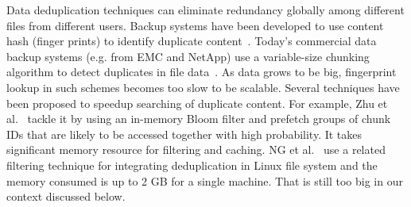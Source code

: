 Data deduplication techniques can eliminate redundancy globally among different files from different users. 
Backup systems have been developed to use content hash (finger prints) to identify duplicate 
content~\cite{venti02,Rhea2008}.
Today's commercial data backup systems (e.g. from EMC and NetApp)
use a variable-size chunking algorithm to detect duplicates in file data~\cite{similar94,hydrastor09}.
As data grows to be big, fingerprint lookup in such schemes
becomes too slow to be scalable.
Several techniques have been proposed to speedup searching of duplicate 
content. For example,  
Zhu et al.~\cite{bottleneck08} tackle it 
by using an in-memory Bloom filter and prefetch groups of chunk IDs that are likely to be 
accessed together with high probability. It takes significant memory resource for filtering and caching.
NG et al.~\cite{ NGmiddleware2011}  use  
a related filtering technique for integrating deduplication in Linux  file system and the memory
consumed is up to 2 GB for a single machine. That is still too big in our context discussed below. 

